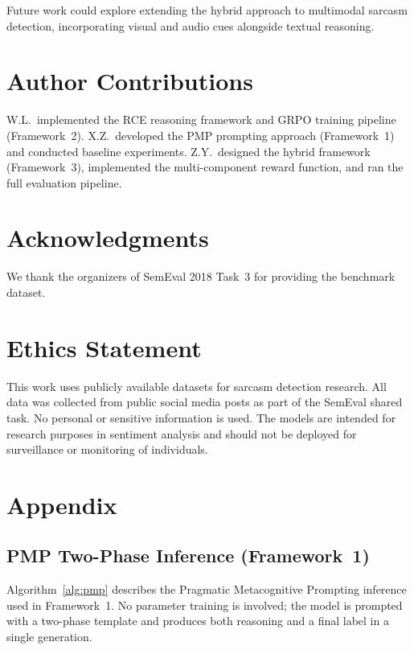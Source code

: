\documentclass{article} %
\begin{document}
Future work could explore extending the hybrid approach to multimodal sarcasm detection, incorporating visual and audio cues alongside textual reasoning.


\section*{Author Contributions}
W.L.\ implemented the RCE reasoning framework and GRPO training pipeline (Framework~2). X.Z.\ developed the PMP prompting approach (Framework~1) and conducted baseline experiments. Z.Y.\ designed the hybrid framework (Framework~3), implemented the multi-component reward function, and ran the full evaluation pipeline.

\section*{Acknowledgments}
We thank the organizers of SemEval 2018 Task~3 for providing the benchmark dataset.

\section*{Ethics Statement}
This work uses publicly available datasets for sarcasm detection research. All data was collected from public social media posts as part of the SemEval shared task. No personal or sensitive information is used. The models are intended for research purposes in sentiment analysis and should not be deployed for surveillance or monitoring of individuals.


\newpage



\newpage
\appendix
\section{Appendix}

\subsection{PMP Two-Phase Inference (Framework~1)}

Algorithm~\ref{alg:pmp} describes the Pragmatic Metacognitive Prompting inference used in Framework~1. No parameter training is involved; the model is prompted with a two-phase template and produces both reasoning and a final label in a single generation.
\end{document}

